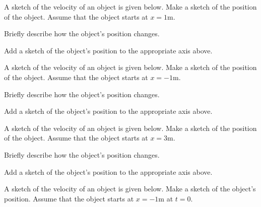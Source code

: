 \begin{problem}
  \item A sketch of the velocity of an object is given below.
    Make a sketch of the position of the object. Assume that
    the object starts at $x=1$m.

    \scalebox{0.8}{}

    \begin{subproblem}
    \item Briefly describe how the object's position changes.
      \vfill
    \item Add a sketch of the object's position to the appropriate
      axis above.
    \end{subproblem}

    \clearpage

    \item A sketch of the velocity of an object is given below.
      Make a sketch of the position of the object. Assume that
      the object starts at $x=-1$m.

      \scalebox{0.8}{}

    \begin{subproblem}
    \item Briefly describe how the object's position changes.
      \vfill
    \item Add a sketch of the object's position to the appropriate
      axis above.
    \end{subproblem}

    \clearpage

    \item A sketch of the velocity of an object is given below.
      Make a sketch of the position of the object. Assume that
      the object starts at $x=3$m.

      \scalebox{0.8}{}

    \begin{subproblem}
    \item Briefly describe how the object's position changes.
      \vfill
    \item Add a sketch of the object's position to the appropriate
      axis above.
    \end{subproblem}

    \clearpage

  \item A sketch of the velocity of an object is given below. Make a
    sketch of the object's position. Assume that the object starts at
    $x=-1$m at $t=0$.


\end{problem}
